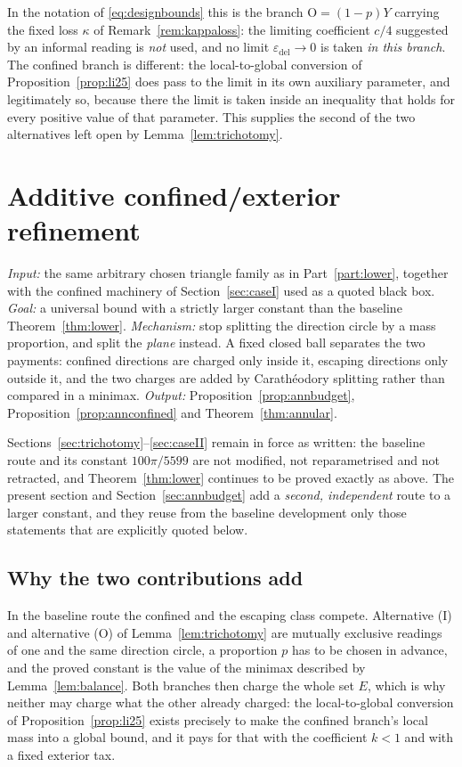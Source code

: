 \documentclass[11pt]{article}
\theoremstyle{plain}
\theoremstyle{definition}
\theoremstyle{remark}
\newcommand{\epsdel}{\varepsilon_{\mathrm{del}}}
\begin{document}
In the notation of \eqref{eq:designbounds} this is the branch
$\mathrm{O}=(1-p)Y$ carrying the fixed loss $\kappa$ of
Remark~\ref{rem:kappaloss}: the limiting coefficient $c/4$ suggested by an
informal reading is \emph{not} used, and no limit $\epsdel\to0$ is taken
\emph{in this branch}. The confined branch is different: the local-to-global
conversion of Proposition~\ref{prop:li25} does pass to the limit in its own
auxiliary parameter, and legitimately so, because there the limit is taken
inside an inequality that holds for every positive value of that parameter.
This supplies the second of the two alternatives left open by
Lemma~\ref{lem:trichotomy}.

\section{Additive confined/exterior refinement}\label{sec:additive}

\emph{Input:} the same arbitrary chosen triangle family as in
Part~\ref{part:lower}, together with the confined machinery of
Section~\ref{sec:caseI} used as a quoted black box. \emph{Goal:} a universal
bound with a strictly larger constant than the baseline
Theorem~\ref{thm:lower}. \emph{Mechanism:} stop splitting the direction circle
by a mass proportion, and split the \emph{plane} instead. A fixed closed ball
separates the two payments: confined directions are charged only inside it,
escaping directions only outside it, and the two charges are added by
Carath\'eodory splitting rather than compared in a minimax. \emph{Output:}
Proposition~\ref{prop:annbudget}, Proposition~\ref{prop:annconfined} and
Theorem~\ref{thm:annular}.

Sections~\ref{sec:trichotomy}--\ref{sec:caseII} remain in force as written: the
baseline route and its constant $100\pi/5599$ are not modified, not
reparametrised and not retracted, and Theorem~\ref{thm:lower} continues to be
proved exactly as above. The present section and
Section~\ref{sec:annbudget} add a \emph{second, independent} route to a larger
constant, and they reuse from the baseline development only those statements
that are explicitly quoted below.

\subsection{Why the two contributions add}\label{sec:addidea}

In the baseline route the confined and the escaping class compete. Alternative
(I) and alternative (O) of Lemma~\ref{lem:trichotomy} are mutually exclusive
readings of one and the same direction circle, a proportion $p$ has to be
chosen in advance, and the proved constant is the value of the minimax
described by Lemma~\ref{lem:balance}. Both branches then charge the whole set
$E$, which is why neither may charge what the other already charged: the
local-to-global conversion of Proposition~\ref{prop:li25} exists precisely to
make the confined branch's local mass into a global bound, and it pays for that
with the coefficient $k<1$ and with a fixed exterior tax.
\end{document}
